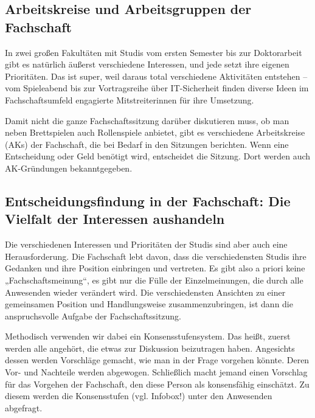 
\subsection{Arbeitskreise und Arbeitsgruppen der Fachschaft}

In zwei großen Fakultäten mit Studis vom ersten Semester bis zur Doktorarbeit gibt es natürlich äußerst verschiedene Interessen, und jede setzt ihre eigenen Prioritäten. Das ist super, weil daraus total verschiedene Aktivitäten entstehen -- vom Spieleabend bis zur Vortragsreihe über IT-Sicherheit finden diverse Ideen im Fachschaftsumfeld engagierte Mitstreiterinnen für ihre Umsetzung.

Damit nicht die ganze Fachschaftssitzung darüber diskutieren muss, ob man neben Brettspielen auch Rollenspiele anbietet, gibt es verschiedene Arbeitskreise (AKs) der Fachschaft, die bei Bedarf in den Sitzungen berichten. Wenn eine Entscheidung oder Geld benötigt wird, entscheidet die Sitzung. Dort werden auch AK-Gründungen bekanntgegeben.

\subsection{Entscheidungsfindung in der Fachschaft: Die Vielfalt der Interessen aushandeln}


Die verschiedenen Interessen und Prioritäten der Studis sind aber auch eine Herausforderung. Die Fachschaft lebt davon, dass die verschiedensten Studis ihre Gedanken und ihre Position einbringen und vertreten. Es gibt also a priori keine „Fachschaftsmeinung“, es gibt nur die Fülle der Einzelmeinungen, die durch alle Anwesenden wieder verändert wird. Die verschiedensten Ansichten zu einer gemeinsamen Position und Handlungsweise zusammenzubringen, ist dann die anspruchsvolle Aufgabe der Fachschaftssitzung.

Methodisch verwenden wir dabei ein Konsensstufensystem. Das heißt, zuerst werden alle angehört, die etwas zur Diskussion beizutragen haben. Angesichts dessen werden Vorschläge gemacht, wie man in der Frage vorgehen könnte. Deren Vor- und Nachteile werden abgewogen. Schließlich macht jemand einen Vorschlag für das Vorgehen der Fachschaft, den diese Person als konsensfähig einschätzt. Zu diesem werden die Konsensstufen (vgl. Infobox!) unter den Anwesenden abgefragt.

